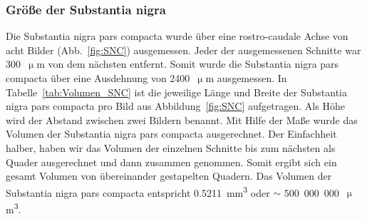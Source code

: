 \documentclass[12pt,a4paper,pdftex]{article}
\begin{document}

\subsubsection{Größe der Substantia nigra}


Die Substantia nigra pars compacta  wurde über eine rostro-caudale Achse von acht Bilder (Abb.~\ref{fig:SNC}) ausgemessen. Jeder der ausgemessenen Schnitte war 300~$\upmu$m von dem nächsten entfernt. Somit wurde die Substantia nigra pars compacta über eine Ausdehnung von 2400~$\upmu$m ausgemessen. In Tabelle~\ref{tab:Volumen_SNC} ist die jeweilige Länge und Breite der Substantia nigra pars compacta pro Bild aus Abbildung~\ref{fig:SNC} aufgetragen. Als Höhe wird der Abstand zwischen zwei Bildern benannt. Mit Hilfe der Maße wurde das Volumen der Substantia nigra pars compacta ausgerechnet. Der Einfachheit halber, haben wir das Volumen der einzelnen Schnitte bis zum nächsten als Quader ausgerechnet und dann zusammen genommen. Somit ergibt sich ein gesamt Volumen von übereinander gestapelten Quadern. Das Volumen der Substantia nigra pars compacta entspricht 0.5211~mm\textsuperscript{3} oder $\sim$ 500~000~000~$\upmu$m\textsuperscript{3}.
\end{document}
